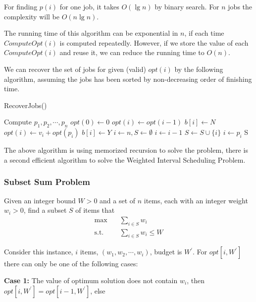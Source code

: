 					For finding $p(i)$ for one job, it takes $O(\lg n)$ by binary search. For $n$ jobs the complexity will be $O(n\lg n)$.

					The running time of this algorithm can be exponential in $n$, if each time $ComputeOpt(i)$ is computed repeatedly. However, if we store the value of each $ComputeOpt(i)$ and reuse it, we can reduce the running time to $O(n)$.

					We can recover the set of jobs for given (valid) $opt(i)$ by the following algorithm, assuming the jobs has been sorted by non-decreasing order of finishing time.
					\begin{algorithm}[h]
						\caption{RecoverJobs()}
						\begin{algorithmic}[1]
							\State Compute $p_1, p_2, \cdots, p_n$
							\State $opt(0) \gets 0$
									\State $opt(i) \gets opt(i - 1)$
									\State $b[i] \gets N$								
								\Else
									\State $opt(i) \gets v_i + opt(p_i)$
									\State $b[i] \gets Y$
								\EndIf
							\EndFor
							\State $i \gets n, S\gets \emptyset$
							\While {$i \ne 0$}
								\If {$b[i] == N$}
									\State $i \gets i - 1$
								\Else
									\State $S \gets S \cup \{i\}$
									\State $i \gets p_i$
								\EndIf
							\EndWhile
							\State \Return S
						\end{algorithmic}
					\end{algorithm}

					The above algorithm is using memorized recursion to solve the problem, there is a second efficient algorithm to solve the Weighted Interval Scheduling Problem.

				\subsubsection{Subset Sum Problem}
					Given an integer bound $W > 0$ and a set of $n$ items, each with an integer weight $w_i > 0$, find a subset $S$ of items that
					\begin{align}
						\max \quad &\sum_{i \in S} w_i\\
						\text{s.t.} \quad & \sum_{i \in S} w_i \le W
					\end{align}

					Consider this instance, $i$ items, $(w_1, w_2, \cdots, w_i)$, budget is $W^\prime$. For $opt[i, W^\prime]$ there can only be one of the following cases:

					\textbf{Case 1: }The value of optimum solution does not contain $w_i$, then $opt[i, W^\prime] = opt[i - 1, W^\prime]$, else

